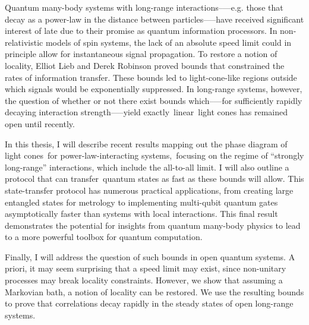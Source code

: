 Quantum many-body systems with long-range interactions--—e.g. those that decay as a power-law in the distance between particles—--have received significant interest of late due to their promise as quantum information processors. In non-relativistic models of spin systems, the lack of an absolute speed limit could in principle allow for instantaneous signal propagation. To restore a notion of locality, Elliot Lieb and Derek Robinson proved bounds that constrained the rates of information transfer. These bounds led to light-cone-like regions outside which signals would be exponentially suppressed. In long-range systems, however, the question of whether or not there exist bounds which--—for sufficiently rapidly decaying interaction strength—--yield exactly linear light cones has remained open until recently. 

In this thesis, I will describe recent results mapping out the phase diagram of light cones for power-law-interacting systems, focusing on the regime of ``strongly long-range'' interactions, which include the all-to-all limit. I will also outline a protocol that can transfer quantum states as fast as these bounds will allow. This state-transfer protocol has numerous practical applications, from creating large entangled states for metrology to implementing multi-qubit quantum gates asymptotically faster than systems with local interactions. This final result demonstrates the potential for insights from quantum many-body physics to lead to a more powerful toolbox for quantum computation.

Finally, I will address the question of such bounds in open quantum systems. A priori, it may seem surprising that a speed limit may exist, since non-unitary processes may break locality constraints. However, we show that assuming a Markovian bath, a notion of locality can be restored. We use the resulting bounds to prove that correlations decay rapidly in the steady states of open long-range systems.
